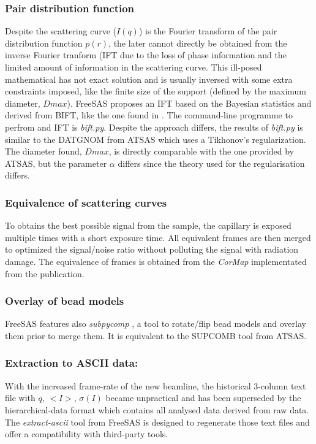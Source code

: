 \documentclass[preprint]{iucr}              %
\begin{document}
\subsubsection{Pair distribution function}
Despite the scattering curve ($I(q)$) is the Fourier transform of the pair distribution function $p(r)$, the later cannot directly be obtained from the
inverse Fourier tranform (IFT due to the loss of phase information and the limited amount of information in the scattering curve. 
This ill-posed mathematical has not exact solution and is usually inversed with some extra constraints imposed, like the finite size of the support (defined by the maximum diameter, $Dmax$).    
FreeSAS proposes an IFT based on the Bayesian statistics and derived from BIFT\cite{bift}, like the one found in \cite{bioxtasraw}.
The command-line programme to perfrom and IFT is \textit{bift.py}. 
Despite the approach differs, the results of \textit{bift.py} is similar to the DATGNOM\cite{ATSAS1} from ATSAS which uses a Tikhonov's regularization.
The diameter found, $Dmax$, is directly comparable with the one provided by ATSAS, but the parameter $\alpha$ differs since the theory used for the regularisation differs. 

\subsubsection{Equivalence of scattering curves}
To obtains the best possible signal from the sample, the capillary is exposed multiple times with a short exposure time.
All equivalent frames are then merged to optimized the signal/noise ratio without polluting the signal with radiation damage.  
The equivalence of frames is obtained from the \textit{CorMap} \cite{cormap} implementated from the publication. 

\subsubsection{Overlay of bead models}
FreeSAS features also \textit{subpycomp} \cite{BM29ODA}, a tool to rotate/flip bead models and overlay them prior to merge them. It is equivalent to the SUPCOMB\cite{supcomb} tool from ATSAS. 

\subsubsection{Extraction to ASCII data:} With the increased frame-rate of the new beamline, the historical 3-column text file with $q$, $<I>$, $\sigma(I)$ became unpractical and has been superseded by the hierarchical-data format \cite{hdf5} which contains all analysed data derived from raw data.
The \textit{extract-ascii} tool from FreeSAS is designed to regenerate those text files and offer a compatibility with third-party tools.
\end{document}
